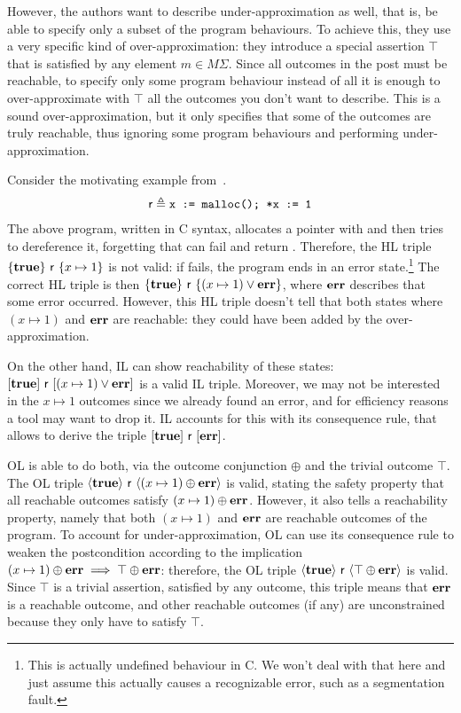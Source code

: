 However, the authors want to describe under-approximation as well, that is, be able to specify only a subset of the program behaviours. To achieve this, they use a very specific kind of over-approximation: they introduce a special assertion $\top$ that is satisfied by any element $m \in M \Sigma$. Since all outcomes in the post must be reachable, to specify only some program behaviour instead of all it is enough to over-approximate with $\top$ all the outcomes you don't want to describe. This is a sound over-approximation, but it only specifies that some of the outcomes are truly reachable, thus ignoring some program behaviours and performing under-approximation.

\begin{example}\label{ex:sota:ol}
	Consider the motivating example from~\cite[\S~2.1]{ZDS23}.
	\begin{align*}
		\mathsf{r} \triangleq \texttt{x := malloc(); *x := 1}
	\end{align*}
	The above program, written in C syntax, allocates a pointer with  and then tries to dereference it, forgetting that  can fail and return . Therefore, the HL triple $\{\textbf{true}\}~\mathsf{r}~\{x \mapsto 1\}$ is not valid: if  fails, the program ends in an error state.\footnote{This is actually undefined behaviour in C. We won't deal with that here and just assume this actually causes a recognizable error, such as a segmentation fault.} The correct HL triple is then $\{\textbf{true}\}~\mathsf{r}~\{(x \mapsto 1) \lor \textbf{err}\}$, where $\textbf{err}$ describes that some error occurred. However, this HL triple doesn't tell that both states where $(x \mapsto 1)$ and $\textbf{err}$ are reachable: they could have been added by the over-approximation.

	On the other hand, IL can show reachability of these states: $[\textbf{true}]~\mathsf{r}~[(x \mapsto 1) \lor \textbf{err}]$ is a valid IL triple. Moreover, we may not be interested in the $x \mapsto 1$ outcomes since we already found an error, and for efficiency reasons a tool may want to drop it. IL accounts for this with its consequence rule, that allows to derive the triple $[\textbf{true}]~\mathsf{r}~[\textbf{err}]$.

	OL is able to do both, via the outcome conjunction $\oplus$ and the trivial outcome $\top$. The OL triple $\langle {\textbf{true}}\rangle~\mathsf{r}~\langle{(x \mapsto 1) \oplus \textbf{err}}\rangle$ is valid, stating the safety property that all reachable outcomes satisfy $(x \mapsto 1) \oplus \textbf{err}$. However, it also tells a reachability property, namely that both $(x \mapsto 1)$ and $\textbf{err}$ are reachable outcomes of the program. To account for under-approximation, OL can use its consequence rule to weaken the postcondition according to the implication $(x \mapsto 1) \oplus \textbf{err} \implies \top \oplus \textbf{err}$: therefore, the OL triple $\langle {\textbf{true}}\rangle~\mathsf{r}~\langle{\top \oplus \textbf{err}}\rangle$ is valid. Since $\top$ is a trivial assertion, satisfied by any outcome, this triple means that $\textbf{err}$ is a reachable outcome, and other reachable outcomes (if any) are unconstrained because they only have to satisfy $\top$.
\end{example}

